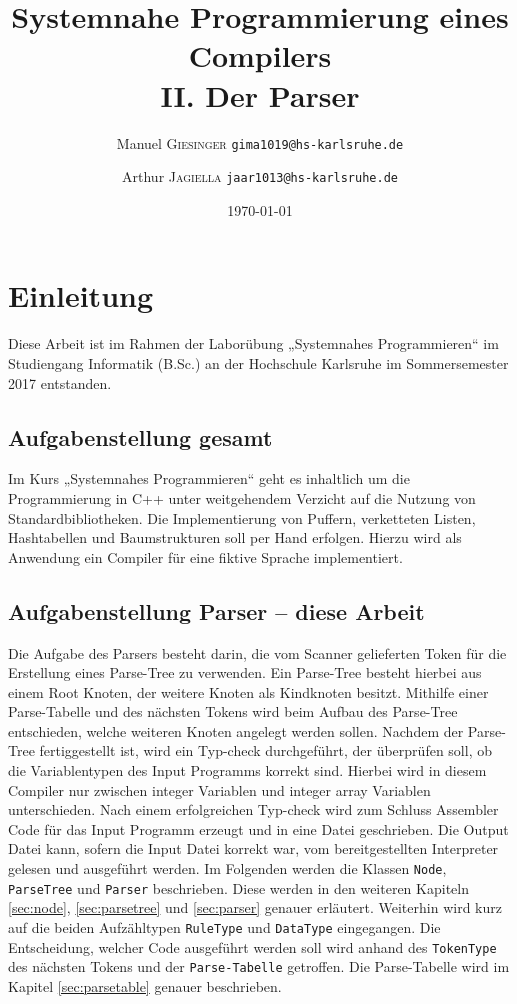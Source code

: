 \documentclass[
a4paper,   %
11pt,      %
oneside,   %
onecolumn, %
final      %
]{article}
\title{Systemnahe Programmierung eines Compilers\\II. Der Parser}
\author{
Manuel \textsc{Giesinger} \hspace{1cm} \texttt{gima1019@hs-karlsruhe.de}
\and
Arthur \textsc{Jagiella} \hspace{1.35cm} \texttt{jaar1013@hs-karlsruhe.de}
}
\date{\today}
\newcommand{\code}[1]{\lstinline$#1$}
\begin{document}
%
\maketitle
\newpage

\tableofcontents
\newpage


\section{Einleitung} %
Diese Arbeit ist im Rahmen der Laborübung „Systemnahes Programmieren“ im Studiengang Informatik (B.Sc.) an der Hochschule Karlsruhe im Sommersemester 2017 entstanden. 

\subsection{Aufgabenstellung gesamt}
Im Kurs „Systemnahes Programmieren“ geht es inhaltlich um die Programmierung in C++ unter weitgehendem Verzicht auf die Nutzung von Standardbibliotheken. Die Implementierung von Puffern, verketteten Listen, Hashtabellen und Baumstrukturen soll per Hand erfolgen. Hierzu wird als Anwendung ein Compiler für eine fiktive Sprache implementiert.

\subsection{Aufgabenstellung Parser -- diese Arbeit} 
Die Aufgabe des Parsers besteht darin, die vom Scanner gelieferten Token für die Erstellung eines Parse-Tree zu verwenden. Ein Parse-Tree besteht hierbei aus einem Root Knoten, der weitere Knoten als Kindknoten besitzt. Mithilfe einer Parse-Tabelle und des nächsten Tokens wird beim Aufbau des Parse-Tree entschieden, welche weiteren Knoten angelegt werden sollen. Nachdem der Parse-Tree fertiggestellt ist, wird ein Typ-check durchgeführt, der überprüfen soll, ob die Variablentypen des Input Programms korrekt sind. Hierbei wird in diesem Compiler nur zwischen integer Variablen und integer array Variablen unterschieden. Nach einem erfolgreichen Typ-check wird zum Schluss Assembler Code für das Input Programm erzeugt und in eine Datei geschrieben. Die Output Datei kann, sofern die Input Datei korrekt war, vom bereitgestellten Interpreter gelesen und ausgeführt werden.
\newline
Im Folgenden werden die Klassen \code{Node}, \code{ParseTree} und \code{Parser} beschrieben. Diese werden in den weiteren Kapiteln \ref{sec:node}, \ref{sec:parsetree} und \ref{sec:parser} genauer erläutert. Weiterhin wird kurz auf die beiden Aufzähltypen \code{RuleType} und \code{DataType} eingegangen. Die Entscheidung, welcher Code ausgeführt werden soll wird anhand des \code{TokenType} des nächsten Tokens und der \code{Parse-Tabelle} getroffen. Die Parse-Tabelle wird im Kapitel \ref{sec:parsetable} genauer beschrieben.
\newpage
\end{document}
